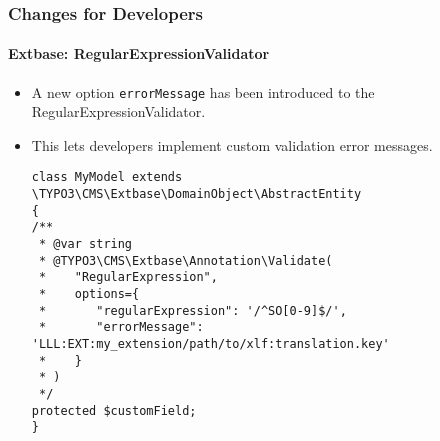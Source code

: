 %

\begin{frame}[fragile]
	\frametitle{Changes for Developers}
	\framesubtitle{Extbase: RegularExpressionValidator}


	\begin{itemize}
		\item A new option \texttt{errorMessage} has been introduced to the RegularExpressionValidator.
		\item This lets developers implement custom validation error messages.
\begin{lstlisting}
class MyModel extends \TYPO3\CMS\Extbase\DomainObject\AbstractEntity
{
/**
 * @var string
 * @TYPO3\CMS\Extbase\Annotation\Validate(
 *    "RegularExpression",
 *    options={
 *       "regularExpression": '/^SO[0-9]$/',
 *       "errorMessage": 'LLL:EXT:my_extension/path/to/xlf:translation.key'
 *    }
 * )
 */
protected $customField;
}
\end{lstlisting}

	\end{itemize}

\end{frame}

